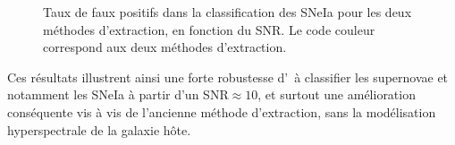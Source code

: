 \documentclass[../main/main.tex]{subfiles}
\begin{document}
\begin{figure}[ht]
  \centering
  \caption[Taux de faux positifs dans la classification des SNeIa.]{Taux de
    faux positifs dans la classification des SNeIa pour les deux
    méthodes d'extraction, en fonction du SNR. Le code couleur
    correspond aux deux méthodes d'extraction.}
  \label{fig:falsepositivesIa}
\end{figure}

Ces résultats illustrent ainsi une forte robustesse d'\hypergal\ à
classifier les supernovae et notamment les SNeIa à partir d'un
SNR$\approx10$, et surtout une amélioration conséquente vis à vis de
l'ancienne méthode d'extraction, sans la modélisation hyperspectrale de
la galaxie hôte. 



\end{document}
